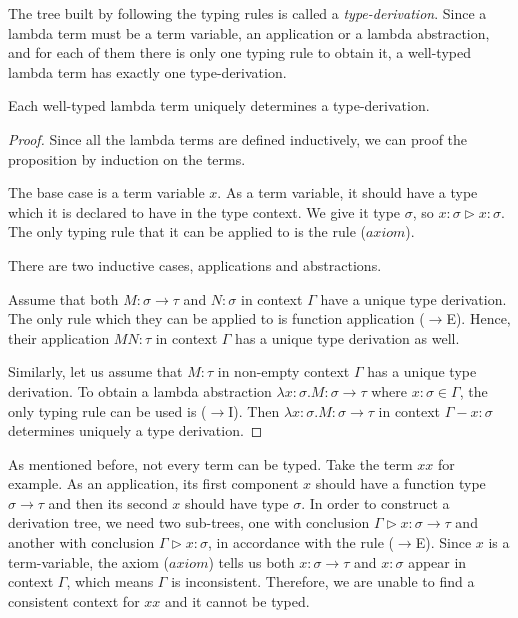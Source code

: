 The tree built by following the typing rules is called a \emph{type-derivation}. Since a lambda term must be a term variable, an application or a lambda abstraction, and for each of them there is only one typing rule to obtain it, a well-typed lambda term has exactly one type-derivation.

\begin{proposition}
\label{proposition:unique_derivation}
Each well-typed lambda term uniquely determines a type-derivation.
\end{proposition}
\begin{proof}
\mbox\\

Since all the lambda terms are defined inductively, we can proof the proposition by induction on the terms.

The base case is a term variable $ x $. As a term variable, it should have a type which it is declared to have in the type context. We give it type $ \sigma $, so $ x: \sigma \triangleright x: \sigma $. The only typing rule that it can be applied to is the rule ($axiom$).

There are two inductive cases, applications and abstractions.

Assume that both $ M: \sigma \to \tau $ and $ N: \sigma $ in context $ \Gamma $ have a unique type derivation. The only rule which they can be applied to is function application ($ \to $E). Hence, their application $ MN: \tau $ in context $ \Gamma $ has a unique type derivation as well.

Similarly, let us assume that $ M: \tau $ in non-empty context $ \Gamma $ has a unique type derivation. To obtain a lambda abstraction $ \lambda x:\sigma . M: \sigma \to \tau $ where $ x: \sigma \in \Gamma $, the only typing rule can be used is ($ \to $I). Then $ \lambda x:\sigma . M: \sigma \to \tau $ in context $ \Gamma - x:\sigma $ determines uniquely a type derivation.

\end{proof}

As mentioned before, not every term can be typed. Take the term $ x x $ for example. As an application, its first component $ x $ should have a function type $ \sigma \to \tau $ and then its second $ x $ should have type $ \sigma $. In order to construct a derivation tree, we need two sub-trees, one with conclusion $ \Gamma \triangleright x: \sigma \to \tau $ and another with conclusion $ \Gamma \triangleright x : \sigma $, in accordance with the rule ($ \to $E). Since $ x $ is a term-variable, the axiom ($ axiom $) tells us both $ x : \sigma \to \tau $ and $ x: \sigma $ appear in context $ \Gamma $, which means $ \Gamma $ is inconsistent. Therefore, we are unable to find a consistent context for $ x x $ and it cannot be typed.


